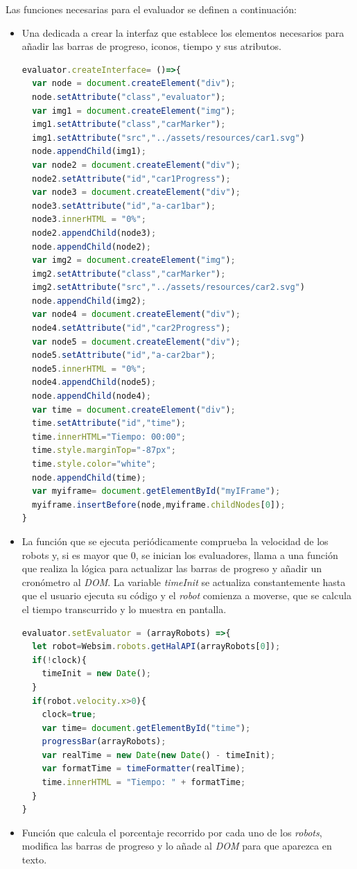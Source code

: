 Las funciones necesarias para el evaluador se definen a continuación: 
\begin{itemize}
    \item Una dedicada a crear la interfaz que establece los elementos necesarios para añadir las barras de progreso, iconos, tiempo y sus atributos.
\begin{lstlisting}[language=javascript]
evaluator.createInterface= ()=>{
  var node = document.createElement("div");
  node.setAttribute("class","evaluator");
  var img1 = document.createElement("img");
  img1.setAttribute("class","carMarker");
  img1.setAttribute("src","../assets/resources/car1.svg")
  node.appendChild(img1);
  var node2 = document.createElement("div");
  node2.setAttribute("id","car1Progress");
  var node3 = document.createElement("div");
  node3.setAttribute("id","a-car1bar");
  node3.innerHTML = "0%";
  node2.appendChild(node3);
  node.appendChild(node2);
  var img2 = document.createElement("img");
  img2.setAttribute("class","carMarker");
  img2.setAttribute("src","../assets/resources/car2.svg")
  node.appendChild(img2);
  var node4 = document.createElement("div");
  node4.setAttribute("id","car2Progress");
  var node5 = document.createElement("div");
  node5.setAttribute("id","a-car2bar");
  node5.innerHTML = "0%";
  node4.appendChild(node5);
  node.appendChild(node4);
  var time = document.createElement("div");
  time.setAttribute("id","time");
  time.innerHTML="Tiempo: 00:00";
  time.style.marginTop="-87px";
  time.style.color="white";
  node.appendChild(time);
  var myiframe= document.getElementById("myIFrame");
  myiframe.insertBefore(node,myiframe.childNodes[0]);
}
\end{lstlisting}
    \item La función que se ejecuta periódicamente comprueba la velocidad de los robots y, si es mayor que 0, se inician los evaluadores, llama a una función que realiza la lógica para actualizar las barras de progreso y añadir un cronómetro al \textit{DOM}. La variable \textit{timeInit} se actualiza constantemente hasta que el usuario ejecuta su código y el \textit{robot} comienza a moverse, que se calcula el tiempo transcurrido y lo muestra en pantalla.
\begin{lstlisting}[language=javascript]
evaluator.setEvaluator = (arrayRobots) =>{
  let robot=Websim.robots.getHalAPI(arrayRobots[0]);
  if(!clock){
    timeInit = new Date();
  }
  if(robot.velocity.x>0){
    clock=true;
    var time= document.getElementById("time");
    progressBar(arrayRobots);
    var realTime = new Date(new Date() - timeInit);
    var formatTime = timeFormatter(realTime);
    time.innerHTML = "Tiempo: " + formatTime;
  }
}
\end{lstlisting}
    \item Función que calcula el porcentaje recorrido por cada uno de los \textit{robots}, modifica las barras de progreso y lo añade al \textit{DOM} para que aparezca en texto.
    

\end{itemize}
